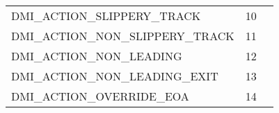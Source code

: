 \documentclass{template/openetcs_article}
\begin{document}
\begin{longtable}{|l|l|l|}
	&	\begin{minipage}[t]{0.30\linewidth} \end{minipage}\\
		\hline
		\begin{minipage}[t]{0.60\linewidth}	DMI\_ACTION\_SLIPPERY\_TRACK\end{minipage}
	&	\begin{minipage}[t]{0.15\linewidth} 10 	\end{minipage}
	&	\begin{minipage}[t]{0.30\linewidth} \end{minipage}\\
		\hline
		\begin{minipage}[t]{0.60\linewidth}	DMI\_ACTION\_NON\_SLIPPERY\_TRACK\end{minipage}
	&	\begin{minipage}[t]{0.15\linewidth} 11 	\end{minipage}
	&	\begin{minipage}[t]{0.30\linewidth} \end{minipage}\\
		\hline
		\begin{minipage}[t]{0.60\linewidth}	DMI\_ACTION\_NON\_LEADING\end{minipage}
	&	\begin{minipage}[t]{0.15\linewidth} 12 	\end{minipage}
	&	\begin{minipage}[t]{0.30\linewidth} \end{minipage}\\
		\hline
		\begin{minipage}[t]{0.60\linewidth}	DMI\_ACTION\_NON\_LEADING\_EXIT\end{minipage}
	&	\begin{minipage}[t]{0.15\linewidth} 13 	\end{minipage}
	&	\begin{minipage}[t]{0.30\linewidth} \end{minipage}\\
		\hline
		\begin{minipage}[t]{0.60\linewidth}	DMI\_ACTION\_OVERRIDE\_EOA\end{minipage}
	&	\begin{minipage}[t]{0.15\linewidth} 14 	\end{minipage}
	&	\begin{minipage}[t]{0.30\linewidth} \end{minipage}\\
		\hline

\end{longtable}
\end{document}
